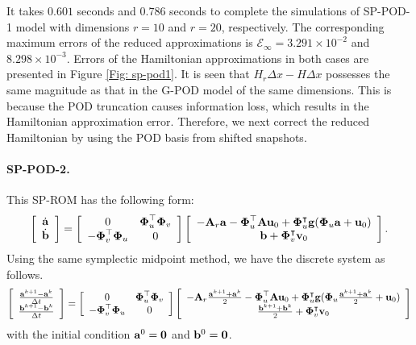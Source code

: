 \documentclass[11pt]{article}
\begin{document}
It takes $0.601$ seconds and $0.786$ seconds to complete the simulations of SP-POD-1 model with dimensions $r=10$ and $r=20$, respectively. The corresponding maximum errors of the reduced approximations is $\mathcal{E}_\infty= 3.291\times 10^{-2}$ and $8.298\times 10^{-3}$.
Errors of the Hamiltonian approximations in both cases are presented in Figure \ref{Fig: sp-pod1}. 
It is seen that $H_r\Delta x-H\Delta x$ possesses the same magnitude as that in the G-POD model of the same dimensions. 
This is because the POD truncation causes information loss, which results in the Hamiltonian approximation error. Therefore, we next correct the reduced Hamiltonian by using the POD basis from shifted snapshots. 

\paragraph{SP-POD-2.} This SP-ROM has the following form: 
\begin{equation}
\left[
\begin{array}{c}
\dot{{\bf a}}\\
\dot{{\bf b}}
\end{array}
\right] =
\left[
\begin{array}{cc}
0 & \boldsymbol{\Phi}_u^\top \boldsymbol{\Phi}_v \\
-\boldsymbol{\Phi}_v^\top \boldsymbol{\Phi}_u & 0
\end{array}
\right]
\left[
\begin{array}{c}
-{\bf A}_r {\bf a} -\boldsymbol{\Phi}_u^\top {\bf A} {\bf u}_0 + \boldsymbol{\Phi}_u^\intercal {\bf g}(\boldsymbol{\Phi}_u {\bf a} +{\bf u}_0) \\
{\bf b} + \boldsymbol{\Phi}_v^\intercal {\bf v}_0
\end{array}
\right].
\end{equation}
Using the same symplectic midpoint method, we have the discrete system as follows. 
\begin{equation}
\left[
\begin{array}{c}
\frac{{\bf a}^{k+1}-{\bf a}^{k}}{\Delta t}\\
\frac{{\bf b}^{k+1}-{\bf b}^{k}}{\Delta t}
\end{array}
\right] =
\left[
\begin{array}{cc}
0 & \boldsymbol{\Phi}_u^\top \boldsymbol{\Phi}_v \\
-\boldsymbol{\Phi}_v^\top \boldsymbol{\Phi}_u & 0
\end{array}
\right]
\left[
\begin{array}{c}
-{\bf A}_r \frac{{\bf a}^{k+1}+{\bf a}^k}{2} -\boldsymbol{\Phi}_u^\top {\bf A} {\bf u}_0 + \boldsymbol{\Phi}_u^\intercal {\bf g}(\boldsymbol{\Phi}_u \frac{{\bf a}^{k+1}+{\bf a}^k}{2}+{\bf u}_0) \\
\frac{{\bf b}^{k+1}+{\bf b}^k}{2}+ \boldsymbol{\Phi}_v^\intercal {\bf v}_0
\end{array}
\right]
\end{equation}
with the initial condition ${\bf a}^0 = {\bf 0}$ and ${\bf b}^0 = {\bf 0}$.
\end{document}
